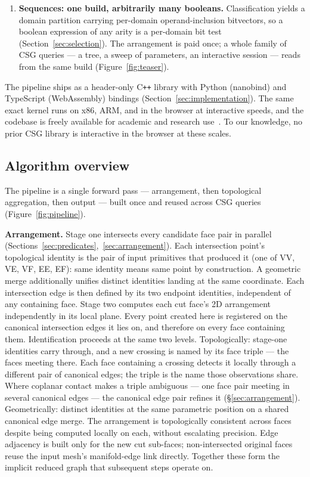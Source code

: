 \documentclass{egpubl}
\begin{document}
\begin{enumerate}
\item \textbf{Sequences: one build, arbitrarily many booleans.}
Classification yields a domain partition carrying per-domain operand-inclusion bitvectors, so a boolean expression of any arity is a per-domain bit test (Section~\ref{sec:selection}). The arrangement is paid once; a whole family of CSG queries --- a tree, a sweep of parameters, an interactive session --- reads from the same build (Figure~\ref{fig:teaser}).
\end{enumerate}

The pipeline ships as a header-only C\texttt{++} library with Python (nanobind) and TypeScript (WebAssembly) bindings (Section~\ref{sec:implementation}). The same exact kernel runs on x86, ARM, and in the browser at interactive speeds, and the codebase is freely available for academic and research use~\cite{trueform2025}. To our knowledge, no prior CSG library is interactive in the browser at these scales.

\subsection{Algorithm overview}
\label{sec:overview}

The pipeline is a single forward pass --- arrangement, then topological aggregation, then output --- built once and reused across CSG queries (Figure~\ref{fig:pipeline}).

\textbf{Arrangement.} Stage one intersects every candidate face pair in parallel (Sections~\ref{sec:predicates},~\ref{sec:arrangement}). Each intersection point's topological identity is the pair of input primitives that produced it (one of VV, VE, VF, EE, EF): same identity means same point by construction. A geometric merge additionally unifies distinct identities landing at the same coordinate. Each intersection edge is then defined by its two endpoint identities, independent of any containing face. Stage two computes each cut face's 2D arrangement independently in its local plane. Every point created here is registered on the canonical intersection edges it lies on, and therefore on every face containing them. Identification proceeds at the same two levels. Topologically: stage-one identities carry through, and a new crossing is named by its face triple --- the faces meeting there. Each face containing a crossing detects it locally through a different pair of canonical edges; the triple is the name those observations share. Where coplanar contact makes a triple ambiguous --- one face pair meeting in several canonical edges --- the canonical edge pair refines it (\S\ref{sec:arrangement}). Geometrically: distinct identities at the same parametric position on a shared canonical edge merge. The arrangement is topologically consistent across faces despite being computed locally on each, without escalating precision. Edge adjacency is built only for the new cut sub-faces; non-intersected original faces reuse the input mesh's manifold-edge link directly. Together these form the implicit reduced graph that subsequent steps operate on.
\end{document}
